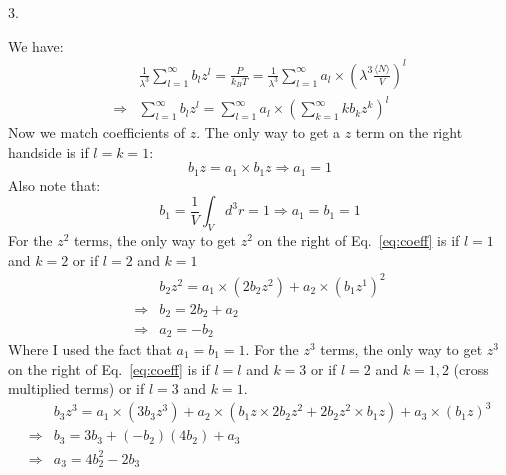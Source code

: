 \documentclass[a4paper,12pt]{article}
\begin{document}
3.
\begin{minipage}[t]{0.9\textwidth}
  We have:
  \begin{align}
                & \frac{1}{\lambda^3} \sum_{l=1}^\infty b_l z^l = \frac{P}{k_BT} = \frac{1}{\lambda^3} \sum_{l =1}^\infty a_l \times \left(\lambda^3 \frac{\langle N\rangle}{V} \right)^l \nonumber\\
    \Rightarrow & \sum_{l=1}^\infty b_l z^l =\sum_{l =1}^\infty a_l \times \left(\sum_{k=1}^\infty k b_k z^k\right)^l \label{eq:coeff}
  \end{align}
  Now we match coefficients of $z$. The only way to get a $z$ term on the right handside is if $l = k = 1$:
  \begin{equation*}
    b_1z = a_1 \times b_1 z \Rightarrow a_1 = 1
  \end{equation*}
  Also note that:
  \begin{equation*}
    b_1 = \frac{1}{V}\int_Vd^3r = 1 \Rightarrow a_1=b_1 = 1
  \end{equation*}
  For the $z^2$ terms, the only way to get $z^2$ on the right of Eq.~\ref{eq:coeff} is if $l = 1$ and $k = 2$ or if $l = 2$ and $k = 1$
  \begin{align*}
                & b_2z^2 = a_1 \times (2 b_2 z^2) + a_2 \times (b_1 z^1)^2\\
    \Rightarrow & b_2 = 2 b_2 + a_2 \\
    \Rightarrow & a_2 = - b_2
  \end{align*}
  Where I used the fact that $a_1 = b_1 = 1$.
  For the $z^3$ terms, the only way to get $z^3$ on the right of Eq.~\ref{eq:coeff} is if $l = l$ and $k = 3$ or if $l = 2$ and $k = 1, 2$ (cross multiplied terms) or if $l = 3$ and $k = 1$. 
  \begin{align*}
                & b_3z^3 = a_1 \times (3 b_3 z^3) + a_2 \times (b_1 z \times 2 b_2 z^2 + 2 b_2 z^2 \times b_1 z) + a_3 \times (b_1 z)^3\\
    \Rightarrow & b_3 = 3 b_3 + (-b_2)(4 b_2) + a_3\\
    \Rightarrow & a_3 = 4 b_2^2 - 2 b_3
  \end{align*}
\end{minipage}
\end{document}
